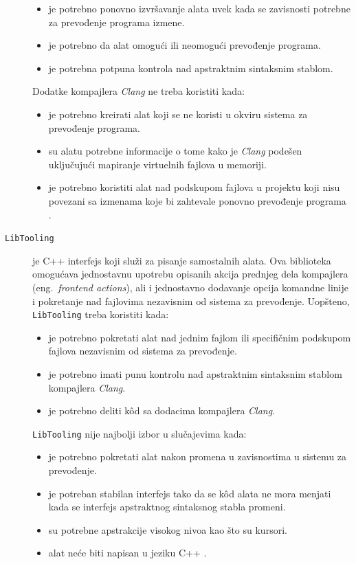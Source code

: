 \documentclass[12pt,oneside]{memoir}
\begin{document}
\begin{description}
\begin{itemize}
\item je potrebno ponovno izvr\v{s}avanje alata uvek kada se zavisnosti potrebne za prevođenje programa izmene.
\item je potrebno da alat omogu\'{c}i ili neomogu\'{c}i prevođenje programa.
\item je potrebna potpuna kontrola nad apstraktnim sintaksnim stablom.
\end{itemize}
Dodatke kompajlera \textit{Clang} ne treba koristiti kada:
\begin{itemize}
\item je potrebno kreirati alat koji se ne koristi u okviru sistema za prevođenje programa.
\item su alatu potrebne informacije o tome kako je \textit{Clang} pode\v{s}en uklju\v{c}uju\'{c}i mapiranje virtuelnih fajlova u memoriji.
\item je potrebno koristiti alat nad podskupom fajlova u projektu koji nisu povezani sa izmenama koje bi zahtevale ponovno prevođenje programa \cite{RightInterface}.
\end{itemize}

\item[\texttt{LibTooling}] je C++ interfejs koji slu\v{z}i za pisanje samostalnih alata. Ova biblioteka omogu\'{c}ava jednostavnu
upotrebu opisanih akcija prednjeg dela kompajlera (eng.~\textit{frontend actions}), ali i jednostavno dodavanje opcija komandne linije i pokretanje nad fajlovima 
nezavisnim od sistema za prevođenje. 
Uop\v{s}teno, \texttt{LibTooling} treba koristiti kada:
\begin{itemize}
  \item je potrebno pokretati alat nad jednim fajlom ili specifi\v{c}nim podskupom fajlova nezavisnim od sistema za prevođenje.
  \item je potrebno imati punu kontrolu nad apstraktnim sintaksnim stablom kompajlera \textit{Clang}.
  \item je potrebno deliti k\^{o}d sa dodacima kompajlera \textit{Clang}.
\end{itemize}
\texttt{LibTooling} nije najbolji izbor u slu\v{c}ajevima kada:
\begin{itemize}
  \item je potrebno pokretati alat nakon promena u zavisnostima u sistemu za prevođenje.
  \item je potreban stabilan interfejs tako da se k\^{o}d alata ne mora menjati kada se interfejs apstraktnog sintaksnog stabla promeni.
  \item su potrebne apstrakcije visokog nivoa kao \v{s}to su kursori.
  \item alat ne\'{c}e biti napisan u jeziku C++ \cite{RightInterface}.
\end{itemize}
\end{description}
\end{document}

